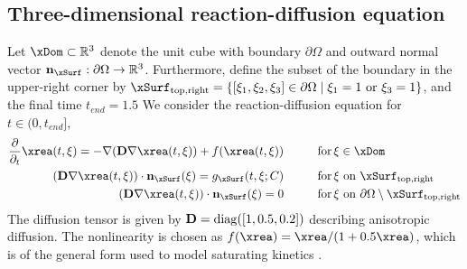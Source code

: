 \documentclass[onefignum,onetabnum]{siamart251104}
\newcommand{\bv}[1]{{\mathbf #1}}
\newcommand{\bt}[1]{{\mathbf{#1}}}
\newcommand{\R}{\mathbb{R}}
\newcommand{\xp}{{\xi}} %
\newcommand{\mydiag}{\rm{diag}}
\begin{document}
\subsection{Three-dimensional reaction-diffusion equation} \label{subsec:num-reacDiff}
Let $\xDom \subset \R^3$ denote the unit cube with boundary $\partial \Omega$ and outward normal vector $\bv{n}_{\xSurf}:\partial \Omega \to \R^3$.  
Furthermore, define the subset of the boundary in the upper-right corner by  $\xSurf_{\rm{top,right}}=  \{ [\xp_1,\xp_2,\xp_3] \in \partial \Omega \mid \xp_1 = 1 \text{ or } \xp_3 = 1 \}$, and the final time $t_{end}=1.5$
We consider the reaction-diffusion equation for $t\in (0,t_{end}]$,
\begin{align*}
\frac{\partial}{\partial_t} \xrea(t,\xp)  = -\nabla (\bt{D} \nabla \xrea(t,\xp) ) + f(\xrea(t,\xp)) \hspace{1cm} &\text{for} \, \xp \in \xDom \\
				(\bt{D} \nabla \xrea(t,\xp)) \cdot \bv{n}_{\xSurf}(\xp) =   g_{\xSurf}(t,\xp;C)  \hspace{1cm} &\text{for} \, \xp \text{ on } \xSurf_{\rm{top,right}} \\
				(\bt{D} \nabla \xrea(t,\xp)) \cdot \bv{n}_{\xSurf}(\xp) =   0  \hspace{1cm} &\text{for} \, \xp \text{ on } \partial \Omega \setminus \xSurf_{\rm{top,right}}\\
\end{align*}
The diffusion tensor is given by $\bt{D}= \mydiag([1, 0.5, 0.2])$ describing anisotropic diffusion. 
The nonlinearity is chosen as $f(\xrea) =  \xrea / (1 + 0.5\xrea)$, which is of the general form used to model saturating kinetics \cite{art:rd-johnson2011original,art:rd-Frank2018}.
%
\end{document}
